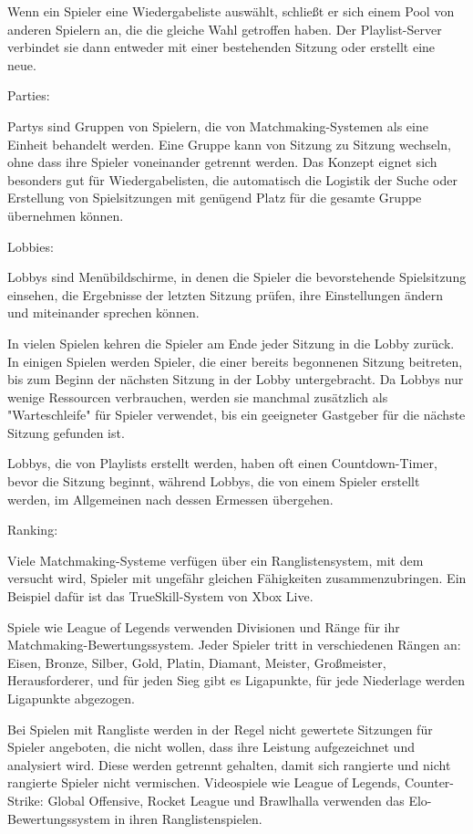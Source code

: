 Wenn ein Spieler eine Wiedergabeliste auswählt, schließt er sich einem Pool von anderen Spielern an, die die gleiche Wahl getroffen haben. Der Playlist-Server verbindet sie dann entweder mit einer bestehenden Sitzung oder erstellt eine neue. 

Parties:

Partys sind Gruppen von Spielern, die von Matchmaking-Systemen als eine Einheit behandelt werden. Eine Gruppe kann von Sitzung zu Sitzung wechseln, ohne dass ihre Spieler voneinander getrennt werden. Das Konzept eignet sich besonders gut für Wiedergabelisten, die automatisch die Logistik der Suche oder Erstellung von Spielsitzungen mit genügend Platz für die gesamte Gruppe übernehmen können. 

Lobbies:

Lobbys sind Menübildschirme, in denen die Spieler die bevorstehende Spielsitzung einsehen, die Ergebnisse der letzten Sitzung prüfen, ihre Einstellungen ändern und miteinander sprechen können.

In vielen Spielen kehren die Spieler am Ende jeder Sitzung in die Lobby zurück. In einigen Spielen werden Spieler, die einer bereits begonnenen Sitzung beitreten, bis zum Beginn der nächsten Sitzung in der Lobby untergebracht. Da Lobbys nur wenige Ressourcen verbrauchen, werden sie manchmal zusätzlich als "Warteschleife" für Spieler verwendet, bis ein geeigneter Gastgeber für die nächste Sitzung gefunden ist.

Lobbys, die von Playlists erstellt werden, haben oft einen Countdown-Timer, bevor die Sitzung beginnt, während Lobbys, die von einem Spieler erstellt werden, im Allgemeinen nach dessen Ermessen übergehen.

Ranking:

Viele Matchmaking-Systeme verfügen über ein Ranglistensystem, mit dem versucht wird, Spieler mit ungefähr gleichen Fähigkeiten zusammenzubringen. Ein Beispiel dafür ist das TrueSkill-System von Xbox Live.

Spiele wie League of Legends verwenden Divisionen und Ränge für ihr Matchmaking-Bewertungssystem. Jeder Spieler tritt in verschiedenen Rängen an: Eisen, Bronze, Silber, Gold, Platin, Diamant, Meister, Großmeister, Herausforderer, und für jeden Sieg gibt es Ligapunkte, für jede Niederlage werden Ligapunkte abgezogen.

Bei Spielen mit Rangliste werden in der Regel nicht gewertete Sitzungen für Spieler angeboten, die nicht wollen, dass ihre Leistung aufgezeichnet und analysiert wird. Diese werden getrennt gehalten, damit sich rangierte und nicht rangierte Spieler nicht vermischen. Videospiele wie League of Legends, Counter-Strike: Global Offensive, Rocket League und Brawlhalla verwenden das Elo-Bewertungssystem in ihren Ranglistenspielen.

